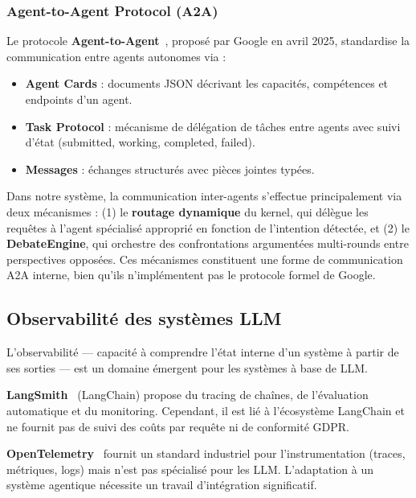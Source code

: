 \documentclass[12pt, a4paper]{article}
\newcommand{\acrshort}[1]{\MakeUppercase{#1}}
\begin{document}
\subsubsection{Agent-to-Agent Protocol (A2A)}

Le protocole \textbf{Agent-to-Agent}~\cite{google2025a2a}, proposé par Google en avril 2025, standardise la communication entre agents autonomes via :

\begin{itemize}
  \item \textbf{Agent Cards} : documents JSON décrivant les capacités, compétences et endpoints d'un agent.
  \item \textbf{Task Protocol} : mécanisme de délégation de tâches entre agents avec suivi d'état (submitted, working, completed, failed).
  \item \textbf{Messages} : échanges structurés avec pièces jointes typées.
\end{itemize}

Dans notre système, la communication inter-agents s'effectue principalement via deux mécanismes : (1) le \textbf{routage dynamique} du kernel, qui délègue les requêtes à l'agent spécialisé approprié en fonction de l'intention détectée, et (2) le \textbf{DebateEngine}, qui orchestre des confrontations argumentées multi-rounds entre perspectives opposées. Ces mécanismes constituent une forme de communication A2A interne, bien qu'ils n'implémentent pas le protocole formel de Google.

\subsection{Observabilité des systèmes LLM}

L'observabilité — capacité à comprendre l'état interne d'un système à partir de ses sorties — est un domaine émergent pour les systèmes à base de \acrshort{llm}.

\textbf{LangSmith}~\cite{langsmith2024} (LangChain) propose du tracing de chaînes, de l'évaluation automatique et du monitoring. Cependant, il est lié à l'écosystème LangChain et ne fournit pas de suivi des coûts par requête ni de conformité GDPR.

\textbf{OpenTelemetry}~\cite{opentelemetry2024} fournit un standard industriel pour l'instrumentation (traces, métriques, logs) mais n'est pas spécialisé pour les \acrshort{llm}. L'adaptation à un système agentique nécessite un travail d'intégration significatif.
\end{document}
